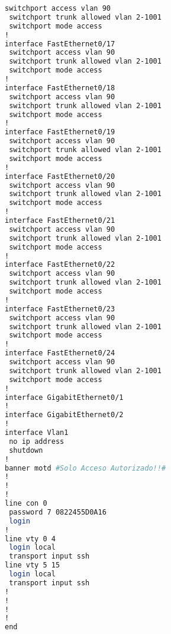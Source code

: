 \begin{lstlisting}[language=Bash, caption={Configuración Completa Switch Admisión}]
 switchport access vlan 90
 switchport trunk allowed vlan 2-1001
 switchport mode access
!
interface FastEthernet0/17
 switchport access vlan 90
 switchport trunk allowed vlan 2-1001
 switchport mode access
!
interface FastEthernet0/18
 switchport access vlan 90
 switchport trunk allowed vlan 2-1001
 switchport mode access
!
interface FastEthernet0/19
 switchport access vlan 90
 switchport trunk allowed vlan 2-1001
 switchport mode access
!
interface FastEthernet0/20
 switchport access vlan 90
 switchport trunk allowed vlan 2-1001
 switchport mode access
!
interface FastEthernet0/21
 switchport access vlan 90
 switchport trunk allowed vlan 2-1001
 switchport mode access
!
interface FastEthernet0/22
 switchport access vlan 90
 switchport trunk allowed vlan 2-1001
 switchport mode access
!
interface FastEthernet0/23
 switchport access vlan 90
 switchport trunk allowed vlan 2-1001
 switchport mode access
!
interface FastEthernet0/24
 switchport access vlan 90
 switchport trunk allowed vlan 2-1001
 switchport mode access
!
interface GigabitEthernet0/1
!
interface GigabitEthernet0/2
!
interface Vlan1
 no ip address
 shutdown
!
banner motd #Solo Acceso Autorizado!!#
!
!
!
line con 0
 password 7 0822455D0A16
 login
!
line vty 0 4
 login local
 transport input ssh
line vty 5 15
 login local
 transport input ssh
!
!
!
!
end
\end{lstlisting}
